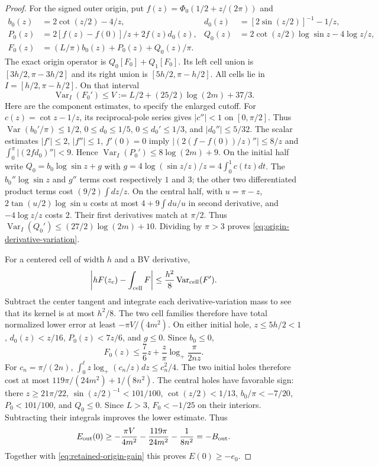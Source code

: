 \begin{proof}
For the signed outer origin, put $f(z)=\Phi_0(1/2+z/(2\pi))$ and
\begin{align*}
 b_0(z)&=2\cot(z/2)-4/z,&d_0(z)&=[2\sin(z/2)]^{-1}-1/z,\\
 P_0(z)&=2[f(z)-f(0)]/z+2f(z)d_0(z),&
 Q_0(z)&=2\cot(z/2)\log\sin z-4\log z/z,\\
 F_0(z)&=(L/\pi)b_0(z)+P_0(z)+Q_0(z)/\pi.
\end{align*}
The exact origin operator is $Q_0[F_0]+Q_1[F_0]$. Its left cell
union is $[3h/2,\pi-3h/2]$ and its right union is
$[5h/2,\pi-h/2]$. All cells lie in $I=[h/2,\pi-h/2]$.
On that interval
\begin{equation}\label{eq:origin-derivative-variation}
 \operatorname{Var}_I(F_0')
 \leq V:=L/2+(25/2)\log(2m)+37/3.
\end{equation}
Here are the component estimates, to specify the enlarged cutoff.
For $c(z)=\cot z-1/z$, its reciprocal-pole series gives
$|c''|<1$ on $[0,\pi/2]$. Thus
$\operatorname{Var}(b_0'/\pi)\leq1/2$,
$0\leq d_0\leq1/5$, $0\leq d_0'\leq1/3$, and
$|d_0''|\leq5/32$. The scalar estimates $|f'|\leq2$,
$|f''|\leq1$, $f'(0)=0$ imply
$|(2(f-f(0))/z)''|\leq8/z$ and
$\int_0^\pi|(2fd_0)''|<9$. Hence
$\operatorname{Var}_I(P_0')\leq8\log(2m)+9$.
On the initial half write
$Q_0=b_0\log\sin z+g$ with
$g=4\log(\sin z/z)/z=4\int_0^1c(tz)dt$.
The $b_0''\log\sin z$ and $g''$ terms cost respectively $1$ and $3$;
the other two differentiated product terms cost
$(9/2)\int dz/z$. On the central half, with $u=\pi-z$,
$2\tan(u/2)\log\sin u$ costs at most $4+9\int du/u$
in second derivative, and $-4\log z/z$ costs $2$.
Their first derivatives match at $\pi/2$. Thus
$\operatorname{Var}_I(Q_0')\leq(27/2)\log(2m)+10$.
Dividing by $\pi>3$ proves \eqref{eq:origin-derivative-variation}.

For a centered cell of width $h$ and a BV derivative,
\[
 \left|hF(z_c)-\int_{\rm cell}F\right|
                \leq\frac{h^2}{8}\operatorname{Var}_{\rm cell}(F').
\]
Subtract the center tangent and integrate each derivative-variation
mass to see that its kernel is at most $h^2/8$.
The two cell families therefore have total normalized lower error
at least $-\pi V/(4m^2)$.
On either initial hole, $z\leq5h/2<1$,
$d_0(z)<z/16$, $P_0(z)<7z/6$, and $g\leq0$. Since $b_0\leq0$,
\[
 F_0(z)\leq\frac76z+\frac z\pi
                    \log_+\frac{\pi}{2nz}.
\]
For $c_n=\pi/(2n)$,
$\int_0^\ell z\log_+(c_n/z)dz\leq c_n^2/4$. The two initial
holes therefore cost at most $119\pi/(24m^2)+1/(8n^2)$.
The central holes have favorable sign: there
$z\geq21\pi/22$, $\sin(z/2)^{-1}<101/100$,
$\cot(z/2)<1/13$, $b_0/\pi<-7/20$, $P_0<101/100$,
and $Q_0\leq0$. Since $L>3$, $F_0<-1/25$ on their interiors.
Subtracting their integrals improves the lower estimate. Thus
\[
 E_{\rm out}(0)\geq-\frac{\pi V}{4m^2}
                         -\frac{119\pi}{24m^2}-\frac1{8n^2}
                    =-B_{\rm out}.
\]
Together with \eqref{eq:retained-origin-gain} this proves $E(0)\geq-e_0$.


\end{proof}
